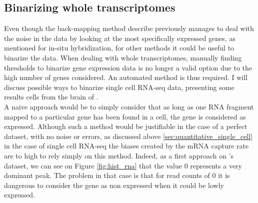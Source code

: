   \subsection{Binarizing whole transcriptomes}
  
  Even though the back-mapping method describe previously manages to deal with the noise in the data by looking at the most specifically expressed genes, as mentioned for in-situ hybridization, for other methods it could be useful to binarize the data. When dealing with whole transcriptomes, manually finding thresholds to binarize gene expression data is no longer a valid option due to the high number of genes considered. An automated method is thus required. I will discuss possible ways to binarize single cell RNA-seq data, presenting some results cells from the brain of \platy{}.\\
  
  A naive approach would be to simply consider that as long as one RNA fragment mapped to a particular gene has been found in a cell, the gene is considered as expressed. Although such a method would be justifiable in the case of a perfect dataset, with no noise or errors, as discussed above \ref{sec:quantitative_single_cell} in the case of single cell RNA-seq the biases created by the mRNA capture rate are to high to rely simply on this method. Indeed, as a first approach on \platy{}'s dataset, we can see on Figure \ref{fig:hist_rna} that the value $0$ represents a very dominant peak. The problem in that case is that for read counts of $0$ it is dangerous to consider the gene as non expressed when it could be lowly expressed.\\
  

